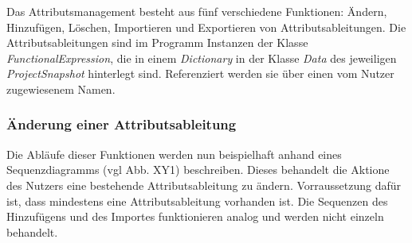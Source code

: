 \documentclass{article}
\begin{document}
\begin{itemize}
Das Attributsmanagement besteht aus fünf verschiedene Funktionen: Ändern, Hinzufügen, Löschen, Importieren und Exportieren von Attributsableitungen. Die Attributsableitungen sind im Programm Instanzen der Klasse \textit{FunctionalExpression}, die in einem \textit{Dictionary} in der Klasse \textit{Data} des jeweiligen \textit{ProjectSnapshot} hinterlegt sind. Referenziert werden sie über einen vom Nutzer zugewiesenem Namen.

\subsubsection{Änderung einer Attributsableitung}
Die Abläufe dieser Funktionen werden nun beispielhaft anhand eines Sequenzdiagramms (vgl Abb. XY1) beschreiben. Dieses behandelt die Aktione des Nutzers eine bestehende Attributsableitung zu ändern. Vorraussetzung dafür ist, dass mindestens eine Attributsableitung vorhanden ist. Die Sequenzen des Hinzufügens und des Importes funktionieren analog und werden nicht einzeln behandelt.


\end{itemize}
\end{document}
